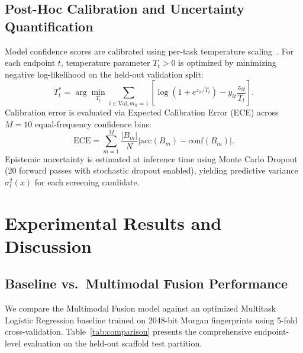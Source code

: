\documentclass[conference]{IEEEtran}
\begin{document}
\subsection{Post-Hoc Calibration and Uncertainty Quantification}
Model confidence scores are calibrated using per-task temperature scaling~\cite{guo2017calibration}. For each endpoint $t$, temperature parameter $T_t > 0$ is optimized by minimizing negative log-likelihood on the held-out validation split:
\begin{equation}
T_t^* = \arg\min_{T_t} \sum_{i \in \mathrm{Val}, m_{it}=1} \left[ \log(1 + e^{z_{it}/T_t}) - y_{it} \frac{z_{it}}{T_t} \right].
\end{equation}
Calibration error is evaluated via Expected Calibration Error (ECE) across $M=10$ equal-frequency confidence bins:
\begin{equation}
\mathrm{ECE} = \sum_{m=1}^M \frac{|B_m|}{N} \left| \mathrm{acc}(B_m) - \mathrm{conf}(B_m) \right|.
\end{equation}
Epistemic uncertainty is estimated at inference time using Monte Carlo Dropout (20 forward passes with stochastic dropout enabled), yielding predictive variance $\sigma_t^2(x)$ for each screening candidate.

\section{Experimental Results and Discussion}
\subsection{Baseline vs.\ Multimodal Fusion Performance}
We compare the Multimodal Fusion model against an optimized Multitask Logistic Regression baseline trained on 2048-bit Morgan fingerprints using 5-fold cross-validation. Table~\ref{tab:comparison} presents the comprehensive endpoint-level evaluation on the held-out scaffold test partition.
\end{document}
